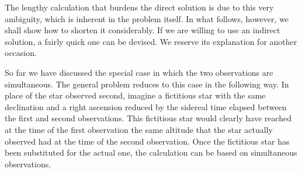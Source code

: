 The lengthy calculation that burdens the direct solution is due to this very ambiguity, which is inherent in the problem itself. In what follows, however, we shall show how to shorten it considerably. If we are willing to use an indirect solution, a fairly quick one can be devised. We reserve its explanation for another occasion.

So far we have discussed the special case in which the two observations are simultaneous. The general problem reduces to this case in the following way. In place of the star observed second, imagine a fictitious star with the same declination and a right ascension reduced by the sidereal time elapsed between the first and second observations. This fictitious star would clearly have reached at the time of the first observation the same altitude that the star actually observed had at the time of the second observation. Once the fictitious star has been substituted for the actual one, the calculation can be based on simultaneous observations.

